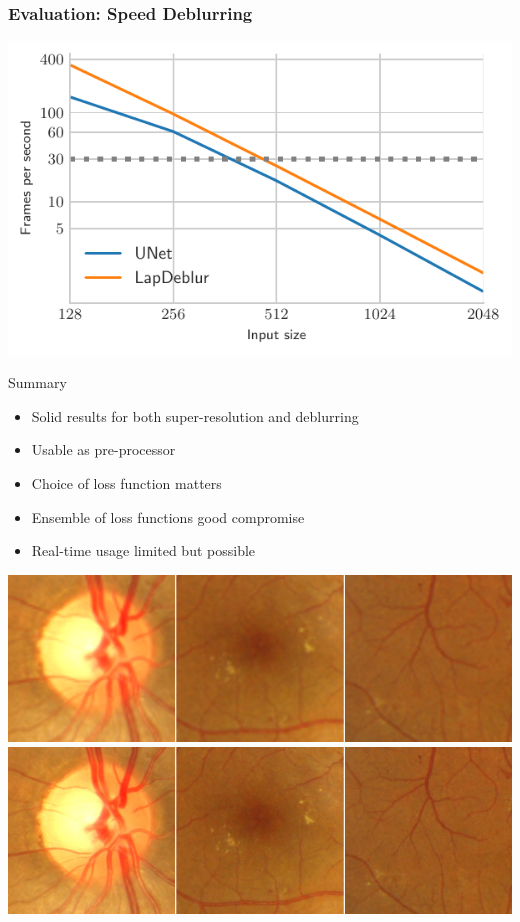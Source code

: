 \documentclass{beamer}
\begin{document}
\begin{frame} \frametitle{Evaluation: Speed Deblurring}
  \includegraphics{time_denoising_beamer}
\end{frame}


\begin{frame}{Summary}
\begin{itemize}
  \item Solid results for both super-resolution and deblurring
  \item Usable as pre-processor
  \item Choice of loss function matters
  \item Ensemble of loss functions good compromise
  \item Real-time usage limited but possible
\end{itemize}

\centering
\includegraphics[width=0.6\linewidth]{collage_sr1_bic}\\
\includegraphics[width=0.6\linewidth]{collage_sr1_gan}
\end{frame}
\end{document}
